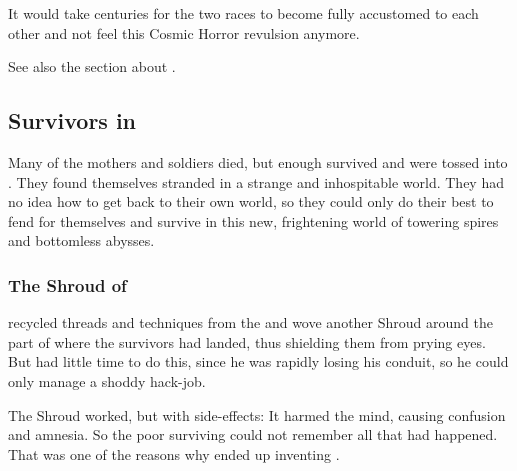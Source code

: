 It would take centuries for the two races to become fully accustomed to each other and not feel this Cosmic Horror revulsion anymore. 

See also the section about . 









\subsection{Survivors in \Nyx}
Many of the mothers and soldiers died, but enough survived and were tossed into \Nyx. 
They found themselves stranded in a strange and inhospitable world. 
They had no idea how to get back to their own world, so they could only do their best to fend for themselves and survive in this new, frightening world of towering spires and bottomless abysses. 





\subsubsection{The Shroud of \Nyx}
\Daggerrain{} recycled threads and techniques from the  and wove another Shroud around the part of \Nyx{} where the survivors had landed, thus shielding them from prying \draconian{} eyes. 
But \Daggerrain{} had little time to do this, since he was rapidly losing his conduit, so he could only manage a shoddy hack-job. 

The Shroud worked, but with side-effects: 
It harmed the mind, causing confusion and amnesia. 
So the poor surviving \nephilim{} could not remember all that had happened. 
That was one of the reasons why \Merkyrah{} ended up inventing . 










\subsection[Semiza]{\Semiza}





